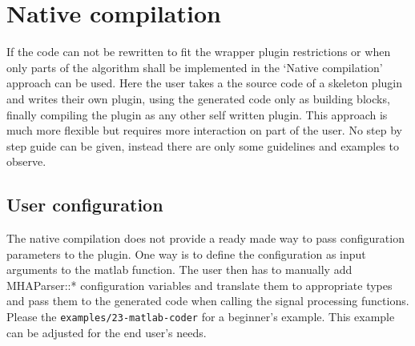 \documentclass[11pt,a4paper,twoside]{article}
\newcommand{\+}{\discretionary{\mbox{\scriptsize$\hookleftarrow$}}{}{}}
\begin{document}
\section{Native compilation}\label{sec:native compilation}
If the code can not be rewritten to fit the wrapper plugin restrictions or when
only parts of the algorithm shall be implemented in \Matlab{} the `Native
compilation' approach can be used.
Here the user takes a the source code of a skeleton \mha{} plugin and writes
their own plugin, using the generated code only as building blocks,
finally compiling the plugin as any other self written \mha{} plugin.
This approach is much more flexible but requires more interaction
on part of the user. No step by step guide can be given, instead there are only
some guidelines and examples to observe. 
\subsection{User configuration}
The native compilation does not provide a ready made way to pass configuration parameters to the plugin.
One way is to define the configuration as input arguments to the matlab function.
The user then has to manually add MHAParser::* configuration variables and translate them to appropriate types and
pass them to the generated code when calling the signal processing functions.
Please the \texttt{examples/23-matlab-coder} for a beginner's example. This
example can be adjusted for the end user's needs.
\end{document}
